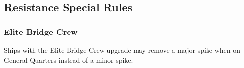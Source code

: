 \subsection{Resistance Special Rules}

\subsubsection{Elite Bridge Crew}
Ships with the Elite Bridge Crew upgrade may remove a major spike when on General Quarters instead of a minor spike.